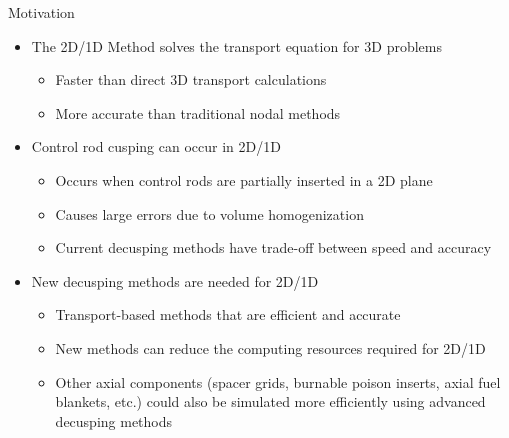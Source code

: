 \begin{frame}[t]{Motivation}

\begin{itemize}
  \item The 2D/1D Method solves the transport equation for 3D problems
  \begin{itemize}
    \item Faster than direct 3D transport calculations
    \item More accurate than traditional nodal methods
  \end{itemize}
  \item Control rod cusping can occur in 2D/1D
  \begin{itemize}
    \item Occurs when control rods are partially inserted in a 2D plane
    \item Causes large errors due to volume homogenization
    \item Current decusping methods have trade-off between speed and accuracy
  \end{itemize}
  \item New decusping methods are needed for 2D/1D
  \begin{itemize}
    \item Transport-based methods that are efficient and accurate
    \item New methods can reduce the computing resources required for 2D/1D
    \item Other axial components (spacer grids, burnable poison inserts, axial fuel blankets, etc.) could also be simulated more efficiently using advanced decusping methods
  \end{itemize}
\end{itemize}

\end{frame}


